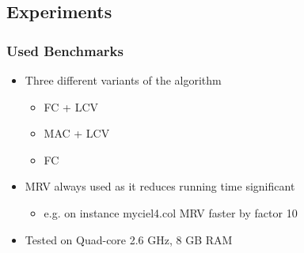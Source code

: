 \documentclass{beamer}
\begin{document}
\subsection{Experiments}
\begin{frame}
    \frametitle{Used Benchmarks}
	
    \begin{itemize}
    \item{Three different variants of the algorithm}
        \begin{itemize}
        \item{FC + LCV}
        \item{MAC + LCV}
        \item{FC}
        \end{itemize}
    \item{MRV always used as it reduces running time significant}
        \begin{itemize}
        \item{e.g. on instance myciel4.col MRV faster by factor 10}
		\end{itemize}    
	\item{Tested on Quad-core 2.6 GHz, 8 GB RAM}
	\end{itemize}
  \end{frame}
\end{document}
